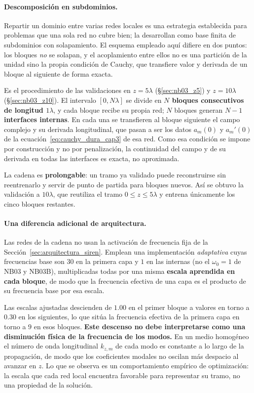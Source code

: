 \paragraph{Descomposición en subdominios.} Repartir un dominio entre varias
redes locales es una estrategia establecida para problemas que una sola red no
cubre bien; \textcite{moseley2023fbpinns} la desarrollan como base finita de
subdominios con solapamiento. El esquema empleado aquí difiere en dos puntos:
los bloques \emph{no} se solapan, y el acoplamiento entre ellos no es una
partición de la unidad sino la propia condición de Cauchy, que transfiere valor
y derivada de un bloque al siguiente de forma exacta.

Es el procedimiento de las
validaciones en $z=5\lambda$ (§\ref{sec:nb03_z5}) y $z=10\lambda$
(§\ref{sec:nb03_z10}). El intervalo $[0,N\lambda]$ se divide en \textbf{$N$
bloques consecutivos de longitud $1\lambda$}, y cada bloque recibe su propia
red; $N$ bloques generan $N-1$ \textbf{interfaces internas}. En cada una se
transfieren al bloque siguiente el campo complejo y su derivada longitudinal,
que pasan a ser los datos $a_m(0)$ y $a_m'(0)$ de la
ecuación~\eqref{eq:cauchy_dura_cap3} de esa red. Como esa condición se impone
por construcción y no por penalización, la continuidad del campo y de su
derivada en todas las interfaces es exacta, no aproximada.

La cadena es \textbf{prolongable}: un tramo ya validado puede reconstruirse sin
reentrenarlo y servir de punto de partida para bloques nuevos. Así se obtuvo la
validación a $10\lambda$, que reutiliza el tramo $0\leq z\leq 5\lambda$ y
entrena únicamente los cinco bloques restantes.

\paragraph{Una diferencia adicional de arquitectura.} Las redes de la cadena no
usan la activación de frecuencia fija de la
Sección~\ref{sec:arquitectura_siren}. Emplean una implementación
\emph{adaptativa} cuyas frecuencias base son $30$ en la primera capa y $1$ en
las internas (no el $\omega_0=1$ de NB03 y NB03B), multiplicadas todas por una
misma \textbf{escala aprendida en cada bloque}, de modo que la frecuencia
efectiva de una capa es el producto de su frecuencia base por esa escala.

Las escalas ajustadas descienden de $1.00$ en el primer bloque a valores en
torno a $0.30$ en los siguientes, lo que sitúa la frecuencia efectiva de la
primera capa en torno a $9$ en esos bloques. \textbf{Este descenso no debe
interpretarse como una disminución física de la frecuencia de los modos.} En un
medio homogéneo el número de onda longitudinal $k_{z,m}$ de cada modo es
constante a lo largo de la propagación, de modo que los coeficientes modales no
oscilan más despacio al avanzar en $z$. Lo que se observa es un comportamiento
empírico de optimización: la escala que cada red local encuentra favorable para
representar su tramo, no una propiedad de la solución.

